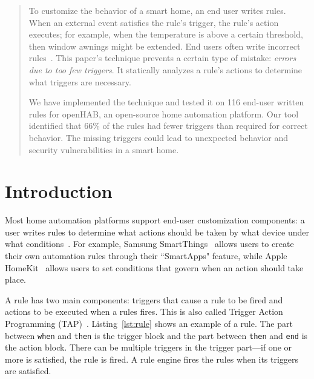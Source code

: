 \documentclass{sig-alternate-05-2015}
\begin{document}
\maketitle
\begin{abstract}
To customize the behavior of a smart home, an end user writes rules.
When an external event satisfies the rule's trigger, the rule's action executes; for example, when
the temperature is above a certain threshold, then window awnings might be extended.
End users often write incorrect rules~\cite{Huang}.
This paper's technique prevents a certain type of mistake:  
\textit{errors due to too few triggers}.
It statically analyzes a rule's actions to determine what triggers are necessary.

We have implemented the technique and tested it on 116 end-user written
rules for openHAB, an open-source home automation platform.
Our tool identified that 66\% of the rules had fewer triggers than required
for correct behavior.
The missing triggers could lead to unexpected behavior
and security vulnerabilities in a smart home.

\end{abstract}

\printccsdesc



\section{Introduction}
Most home automation platforms support end-user customization components: a
user writes rules to determine what actions should be taken by what device
under what conditions~\cite{Newmannowwere}. For example, Samsung
SmartThings~\cite{samsung} allows users to create their own automation
rules through their ``SmartApps" feature, while Apple
HomeKit~\cite{homekit} allows users to set conditions that
govern when an action should take place.

A rule has two main components:
triggers that cause a rule to be fired and actions to be executed when a
rules fires. This is also called Trigger Action Programming
(TAP)~\cite{practical-tap}. Listing~\ref{lst:rule} shows an example of a rule. The part between
\texttt{when} and \texttt{then} is the trigger block and the part between
\texttt{then} and \texttt{end} is the action block. There can be multiple
triggers in the trigger part---if one or more is satisfied, the rule is
fired.
A rule engine fires the rules when its triggers are satisfied.
\end{document}

